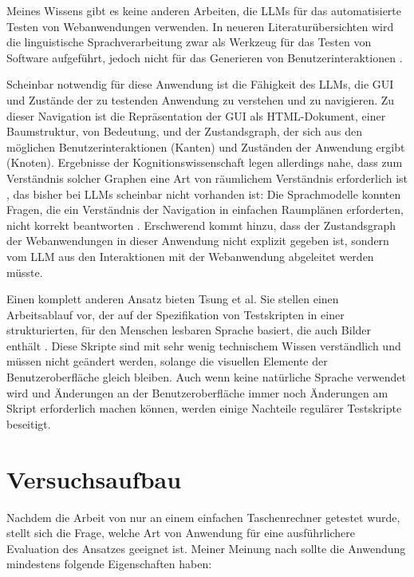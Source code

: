 Meines Wissens gibt es keine anderen Arbeiten, die LLMs für das automatisierte Testen von Webanwendungen verwenden.
In neueren Literaturübersichten wird die linguistische Sprachverarbeitung zwar als Werkzeug für das Testen von Software aufgeführt, jedoch nicht für das Generieren von Benutzerinteraktionen \cite{implementation_verma_2023, machine_fontes_2021}.

Scheinbar notwendig für diese Anwendung ist die Fähigkeit des LLMs, die GUI und Zustände der zu testenden Anwendung zu verstehen und zu navigieren.
Zu dieser Navigation ist die Repräsentation der GUI als HTML-Dokument, einer Baumstruktur, von Bedeutung, und der Zustandsgraph, der sich aus den möglichen Benutzerinteraktionen (Kanten) und Zuständen der Anwendung ergibt (Knoten).
Ergebnisse der Kognitionswissenschaft legen allerdings nahe, dass zum Verständnis solcher Graphen eine Art von räumlichem Verständnis erforderlich ist \cite{what_is_a_cognitive_map}, das bisher bei LLMs scheinbar nicht vorhanden ist:
Die Sprachmodelle konnten Fragen, die ein Verständnis der Navigation in einfachen Raumplänen erforderten, nicht korrekt beantworten \cite{cogmaps_llm}.
Erschwerend kommt hinzu, dass der Zustandsgraph der Webanwendungen in dieser Anwendung nicht explizit gegeben ist, sondern vom LLM aus den Interaktionen mit der Webanwendung abgeleitet werden müsste.

Einen komplett anderen Ansatz bieten Tsung et al.
Sie stellen einen Arbeitsablauf vor, der auf der Spezifikation von Testskripten in einer strukturierten, für den Menschen lesbaren Sprache basiert, die auch Bilder enthält \cite{tsung}.
Diese Skripte sind mit sehr wenig technischem Wissen verständlich und müssen nicht geändert werden, solange die visuellen Elemente der Benutzeroberfläche gleich bleiben.
Auch wenn keine natürliche Sprache verwendet wird und Änderungen an der Benutzeroberfläche immer noch Änderungen am Skript erforderlich machen können, werden einige Nachteile regulärer Testskripte beseitigt.


\chapter{Versuchsaufbau}
\label{ch:ExperimentalSetup}

Nachdem die Arbeit von  nur an einem einfachen Taschenrechner getestet wurde, stellt sich die Frage, welche Art von Anwendung für eine ausführlichere Evaluation des Ansatzes geeignet ist.
Meiner Meinung nach sollte die Anwendung mindestens folgende Eigenschaften haben:

